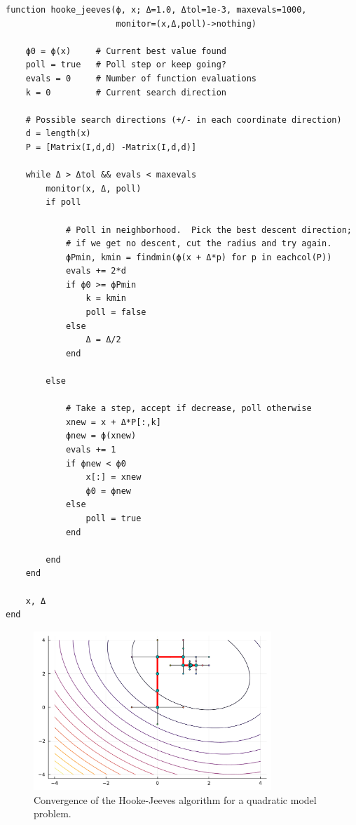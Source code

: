 \documentclass[12pt, leqno]{article} %
\begin{document}
\begin{verbatim}
function hooke_jeeves(ϕ, x; Δ=1.0, Δtol=1e-3, maxevals=1000,
                      monitor=(x,Δ,poll)->nothing)

    ϕ0 = ϕ(x)     # Current best value found
    poll = true   # Poll step or keep going?
    evals = 0     # Number of function evaluations
    k = 0         # Current search direction

    # Possible search directions (+/- in each coordinate direction)
    d = length(x)
    P = [Matrix(I,d,d) -Matrix(I,d,d)]
 
    while Δ > Δtol && evals < maxevals
        monitor(x, Δ, poll)
        if poll

            # Poll in neighborhood.  Pick the best descent direction;
            # if we get no descent, cut the radius and try again.
            ϕPmin, kmin = findmin(ϕ(x + Δ*p) for p in eachcol(P))
            evals += 2*d
            if ϕ0 >= ϕPmin
                k = kmin
                poll = false
            else
                Δ = Δ/2
            end
 
        else

            # Take a step, accept if decrease, poll otherwise
            xnew = x + Δ*P[:,k]
            ϕnew = ϕ(xnew)
            evals += 1
            if ϕnew < ϕ0
                x[:] = xnew
                ϕ0 = ϕnew
            else
                poll = true
            end

        end
    end

    x, Δ
end
\end{verbatim}

\begin{figure}
\begin{center}
\includegraphics[width=0.8\textwidth]{fig/2023-05-01-hooke-jeeves.pdf}
\end{center}
\caption{Convergence of the Hooke-Jeeves algorithm for a quadratic
  model problem.}
\label{fig:hooke-jeeves}
\end{figure}
\end{document}
